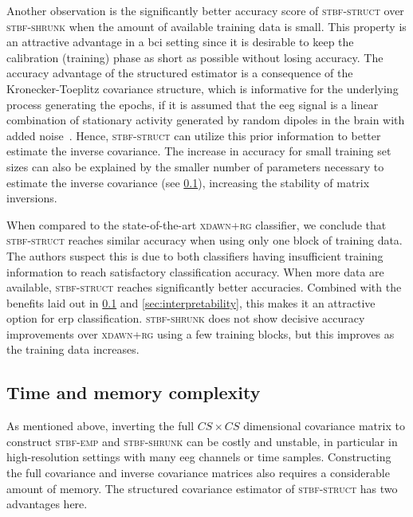 	Another observation is the significantly better accuracy score of
	\textsc{stbf-struct} over \textsc{stbf-shrunk} when the amount of available training data is small.
	This property is an attractive advantage in a \ac{bci} setting since it is desirable to keep the calibration (training) phase as short as possible without losing accuracy.
	The accuracy advantage of the structured estimator is a consequence of the
	Kronecker-Toeplitz covariance structure, which is informative for the
	underlying process generating the epochs, if it is assumed that the \ac{eeg} signal
	is a linear combination of stationary activity generated by random dipoles in
	the brain with added noise~\cite{Munck1992, DeMunck2002, GonzalezNavarro2017}.
	Hence, \textsc{stbf-struct} can utilize this prior information to better estimate the inverse
	covariance.
	The increase in accuracy for small training set sizes can also be explained by the smaller number of parameters necessary to estimate the inverse covariance (see \cref{sec:parameters_complexity}), increasing the stability of matrix inversions.

	When compared to the state-of-the-art \textsc{xdawn+rg} classifier, we conclude
	that \textsc{stbf-struct} reaches similar accuracy when using only one block of
	training data.
	The authors suspect this is due to both
	classifiers having insufficient training information to reach
	satisfactory classification accuracy.
	When more data are available, \textsc{stbf-struct} reaches significantly better accuracies.
	Combined with the benefits laid out in  \cref{sec:parameters_complexity} and
	\cref{sec:interpretability}, this makes it an attractive option for \ac{erp} classification.
	\textsc{stbf-shrunk} does not show decisive accuracy improvements over
	\textsc{xdawn+rg} using a few training blocks, but this improves as the training data increases.

	\subsection{Time and memory complexity}
	\label{sec:parameters_complexity}
	As mentioned above, inverting the full $CS \times CS$ dimensional covariance
	matrix to construct \textsc{stbf-emp} and \textsc{stbf-shrunk} can be costly
	and unstable, in particular in high-resolution settings with many \ac{eeg} channels or time samples.
	Constructing the full covariance and inverse covariance matrices also requires a considerable amount of memory.
	The structured covariance estimator of \textsc{stbf-struct} has two advantages here.

